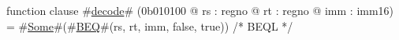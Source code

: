 function clause #\hyperref[zdecode]{decode}# (0b010100 @ rs : regno @ rt : regno @ imm : imm16) =
  #\hyperref[zSome]{Some}#(#\hyperref[zBEQ]{BEQ}#(rs, rt, imm, false, true))   /* BEQL */
